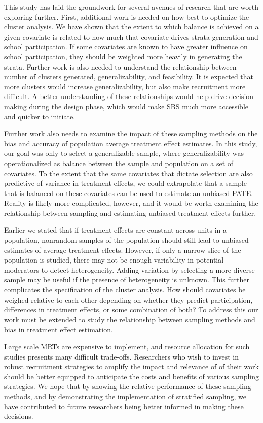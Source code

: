 \documentclass[english,man,floatsintext]{apa6}
\begin{document}
This study has laid the groundwork for several avenues of research that are worth exploring further. First, additional work is needed on how best to optimize the cluster analysis. We have shown that the extent to which balance is achieved on a given covariate is related to how much that covariate drives strata generation and school participation. If some covariates are known to have greater influence on school participation, they should be weighted more heavily in generating the strata. Further work is also needed to understand the relationship between number of clusters generated, generalizability, and feasibility. It is expected that more clusters would increase generalizability, but also make recruitment more difficult. A better understanding of these relationships would help drive decision making during the design phase, which would make SBS much more accessible and quicker to initiate.

Further work also needs to examine the impact of these sampling methods on the bias and accuracy of population average treatment effect estimates. In this study, our goal was only to select a generalizable sample, where generalizability was operationalized as balance between the sample and population on a set of covariates. To the extent that the same covariates that dictate selection are also predictive of variance in treatment effects, we could extrapolate that a sample that is balanced on these covariates can be used to estimate an unbiased PATE. Reality is likely more complicated, however, and it would be worth examining the relationship between sampling and estimating unbiased treatment effects further.

Earlier we stated that if treatment effects are constant across units in a population, nonrandom samples of the population should still lead to unbiased estimates of average treatment effects. However, if only a narrow slice of the population is studied, there may not be enough variability in potential moderators to detect heterogeneity. Adding variation by selecting a more diverse sample may be useful if the presence of heterogeneity is unknown. This further complicates the specification of the cluster analysis. How should covariates be weighed relative to each other depending on whether they predict participation, differences in treatment effects, or some combination of both? To address this our work must be extended to study the relationship between sampling methods and bias in treatment effect estimation.

Large scale MRTs are expensive to implement, and resource allocation for such studies presents many difficult trade-offs. Researchers who wish to invest in robust recruitment strategies to amplify the impact and relevance of of their work should be better equipped to anticipate the costs and benefits of various sampling strategies. We hope that by showing the relative performance of these sampling methods, and by demonstrating the implementation of stratified sampling, we have contributed to future researchers being better informed in making these decisions.
\end{document}
